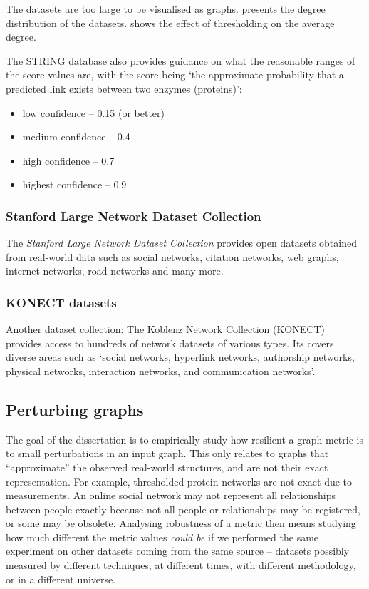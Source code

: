 The datasets are too large to be visualised as graphs.
 presents the degree distribution of the datasets.
 shows the effect of thresholding on the average degree.

The STRING database also provides guidance on what the reasonable ranges of the score values are, with the score being `the approximate probability that a predicted link exists between two enzymes (proteins)':
\begin{itemize}
    \item low confidence -- 0.15 (or better)
    \item medium confidence -- 0.4
    \item high confidence -- 0.7
    \item highest confidence -- 0.9
\end{itemize}

\subsubsection{Stanford Large Network Dataset Collection}

The \textit{Stanford Large Network Dataset Collection}\cite{Large2016} provides open datasets obtained from real-world data such as social networks, citation networks, web graphs, internet networks, road networks and many more.


\subsubsection{KONECT datasets}

Another dataset collection: The Koblenz Network Collection (KONECT)~\cite{Kunegis2013} provides access to hundreds of network datasets of various types.
Its covers diverse areas such as `social networks, hyperlink networks, authorship networks, physical networks, interaction networks, and communication networks'.


\subsection{Perturbing graphs}

The goal of the dissertation is to empirically study how resilient a graph metric is to small perturbations in an input graph.
This only relates to graphs that ``approximate'' the observed real-world structures, and are not their exact representation.
For example, thresholded protein networks are not exact due to measurements.
An online social network may not represent all relationships between people exactly because not all people or relationships may be registered, or some may be obsolete.
Analysing robustness of a metric then means studying how much different the metric values \textsl{could be} if we performed the same experiment on other datasets coming from the same source -- datasets possibly measured by different techniques, at different times, with different methodology, or in a different universe.


